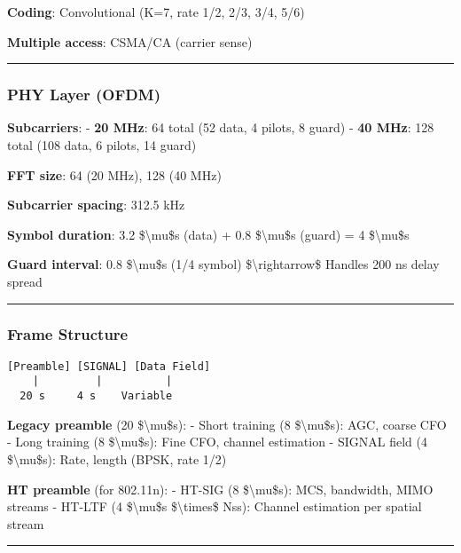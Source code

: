 \textbf{Coding}: Convolutional (K=7, rate 1/2, 2/3, 3/4, 5/6)

\textbf{Multiple access}: CSMA/CA (carrier sense)

\begin{center}\rule{0.5\linewidth}{0.5pt}\end{center}

\subsubsection{PHY Layer (OFDM)}\label{phy-layer-ofdm}

\textbf{Subcarriers}: - \textbf{20 MHz}: 64 total (52 data, 4 pilots, 8
guard) - \textbf{40 MHz}: 128 total (108 data, 6 pilots, 14 guard)

\textbf{FFT size}: 64 (20 MHz), 128 (40 MHz)

\textbf{Subcarrier spacing}: 312.5 kHz

\textbf{Symbol duration}: 3.2 \$\textbackslash mu\$s (data) + 0.8
\$\textbackslash mu\$s (guard) = 4 \$\textbackslash mu\$s

\textbf{Guard interval}: 0.8 \$\textbackslash mu\$s (1/4 symbol)
\$\textbackslash rightarrow\$ Handles 200 ns delay spread

\begin{center}\rule{0.5\linewidth}{0.5pt}\end{center}

\subsubsection{Frame Structure}\label{frame-structure}

\begin{verbatim}
[Preamble] [SIGNAL] [Data Field]
    |         |          |
  20 s     4 s    Variable
\end{verbatim}

\textbf{Legacy preamble} (20 \$\textbackslash mu\$s): - Short training
(8 \$\textbackslash mu\$s): AGC, coarse CFO - Long training (8
\$\textbackslash mu\$s): Fine CFO, channel estimation - SIGNAL field (4
\$\textbackslash mu\$s): Rate, length (BPSK, rate 1/2)

\textbf{HT preamble} (for 802.11n): - HT-SIG (8 \$\textbackslash mu\$s):
MCS, bandwidth, MIMO streams - HT-LTF (4 \$\textbackslash mu\$s
\$\textbackslash times\$ Nss): Channel estimation per spatial stream

\begin{center}\rule{0.5\linewidth}{0.5pt}\end{center}

